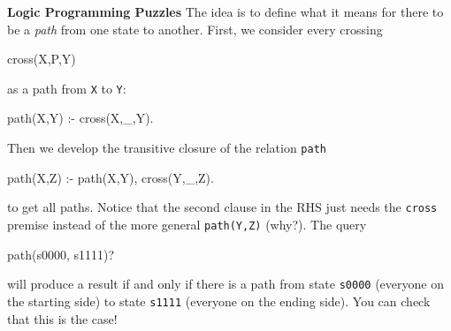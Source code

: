 \begin{minipage}[t]{\sw}
\slidenumber
\LARGE
{\bf Logic Programming Puzzles}\exx
The idea is to define what it means for there to be a {\em path}
from one state to another.
First, we consider every crossing
\begin{qv}
cross(X,P,Y)
\end{qv}
as a path from \verb'X' to \verb'Y':
\begin{qv}
path(X,Y) :- cross(X,_,Y).
\end{qv}
Then we develop the transitive closure of the relation \verb'path'
\begin{qv}
path(X,Z) :- path(X,Y), cross(Y,_,Z).
\end{qv}
to get all paths.
Notice that the second clause in the RHS just needs
the \verb'cross' premise
instead of the more general \verb'path(Y,Z)' (why?).\exx
The query
\begin{qv}
path(s0000, s1111)?
\end{qv}
will produce a result if and only if there is a path
from state \verb's0000' (everyone on the starting side)
to state \verb's1111' (everyone on the ending side).
You can check that this is the case!
\end{minipage}
